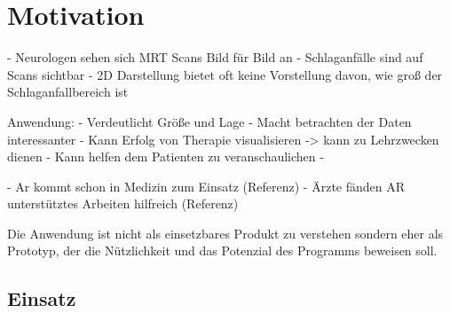 
\chapter{Motivation}

- Neurologen sehen sich MRT Scans Bild für Bild an
- Schlaganfälle sind auf Scans sichtbar
- 2D Darstellung bietet oft keine Vorstellung davon, wie groß der Schlaganfallbereich ist


Anwendung:
- Verdeutlicht Größe und Lage
- Macht betrachten der Daten interessanter
- Kann Erfolg von Therapie visualisieren
-> kann zu Lehrzwecken dienen
- Kann helfen dem Patienten zu veranschaulichen
- 


- Ar kommt schon in Medizin zum Einsatz (Referenz)
- Ärzte fänden AR unterstütztes Arbeiten hilfreich (Referenz)

Die Anwendung ist nicht als einsetzbares Produkt zu verstehen sondern eher als Prototyp, der die Nützlichkeit und das Potenzial des Programms beweisen soll.

\section{Einsatz}

